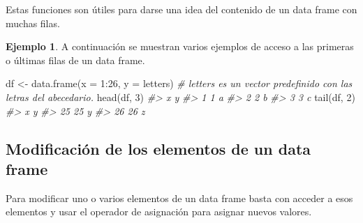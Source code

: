 \documentclass[
]{book}
\newenvironment{Shaded}{\begin{snugshade}}{\end{snugshade}}
\newcommand{\AttributeTok}[1]{\textcolor[rgb]{0.77,0.63,0.00}{#1}}
\newcommand{\CommentTok}[1]{\textcolor[rgb]{0.56,0.35,0.01}{\textit{#1}}}
\newcommand{\DecValTok}[1]{\textcolor[rgb]{0.00,0.00,0.81}{#1}}
\newcommand{\FunctionTok}[1]{\textcolor[rgb]{0.00,0.00,0.00}{#1}}
\newcommand{\NormalTok}[1]{#1}
\newcommand{\OtherTok}[1]{\textcolor[rgb]{0.56,0.35,0.01}{#1}}
\newcommand{\SpecialCharTok}[1]{\textcolor[rgb]{0.00,0.00,0.00}{#1}}
\theoremstyle{definition}
\theoremstyle{definition}
\newtheorem{example}{Ejemplo}[chapter]
\theoremstyle{definition}
\theoremstyle{definition}
\theoremstyle{remark}
\begin{document}
Estas funciones son útiles para darse una idea del contenido de un data frame con muchas filas.

\begin{example}

A continuación se muestran varios ejemplos de acceso a las primeras o últimas filas de un data frame.

\begin{Shaded}
\begin{Highlighting}[]
\NormalTok{df }\OtherTok{\textless{}{-}} \FunctionTok{data.frame}\NormalTok{(}\AttributeTok{x =} \DecValTok{1}\SpecialCharTok{:}\DecValTok{26}\NormalTok{, }\AttributeTok{y =}\NormalTok{ letters) }\CommentTok{\# letters es un vector predefinido con las letras del abecedario.}
\FunctionTok{head}\NormalTok{(df, }\DecValTok{3}\NormalTok{)}
\CommentTok{\#\textgreater{}   x y}
\CommentTok{\#\textgreater{} 1 1 a}
\CommentTok{\#\textgreater{} 2 2 b}
\CommentTok{\#\textgreater{} 3 3 c}
\FunctionTok{tail}\NormalTok{(df, }\DecValTok{2}\NormalTok{)}
\CommentTok{\#\textgreater{}     x y}
\CommentTok{\#\textgreater{} 25 25 y}
\CommentTok{\#\textgreater{} 26 26 z}
\end{Highlighting}
\end{Shaded}

\end{example}

\hypertarget{modificaciuxf3n-de-los-elementos-de-un-data-frame}{%
\subsection{Modificación de los elementos de un data frame}\label{modificaciuxf3n-de-los-elementos-de-un-data-frame}}

Para modificar uno o varios elementos de un data frame basta con acceder a esos elementos y usar el operador de asignación para asignar nuevos valores.
\end{document}
